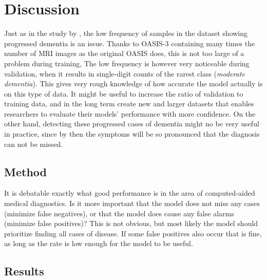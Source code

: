 \documentclass{kththesis}
\begin{document}
\chapter{Discussion}
Just as in the study by \textcite{islam2018early}, the low frequency of samples in the dataset showing progressed dementia is an issue. Thanks to OASIS-3 containing many times the number of MRI images as the original OASIS does, this is not too large of a problem during training, The low frequency is however very noticeable during validation, when it results in single-digit counts of the rarest class (\textit{moderate dementia}). This gives very rough knowledge of how accurate the model actually is on this type of data. It might be useful to increase the ratio of validation to training data, and in the long term create new and larger datasets that enables researchers to evaluate their models' performance with more confidence. On the other hand, detecting these progressed cases of dementia might no be very useful in practice, since by then the symptoms will be so pronounced that the diagnosis can not be missed.

\section{Method}
It is debatable exactly what good performance is in the area of computed-aided medical diagnostics. Is it more important that the model does not miss any cases (minimize false negatives), or that the model does cause any false alarms (minimize false positives)? This is not obvious, but most likely the model should prioritize finding all cases of disease. If some false positives also occur that is fine, as long as the rate is low enough for the model to be useful.

\section{Results}
\end{document}
